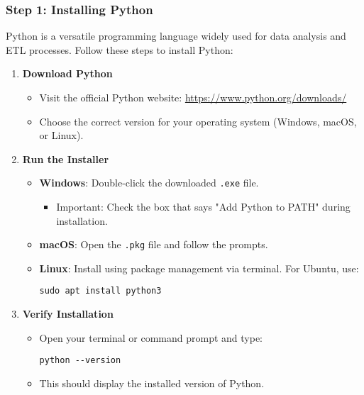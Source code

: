 \documentclass[aspectratio=169]{beamer}
\begin{document}
\begin{frame}[fragile]
    \frametitle{Step 1: Installing Python}
    Python is a versatile programming language widely used for data analysis and ETL processes. Follow these steps to install Python:
    \begin{enumerate}
        \item \textbf{Download Python}
        \begin{itemize}
            \item Visit the official Python website: \url{https://www.python.org/downloads/}
            \item Choose the correct version for your operating system (Windows, macOS, or Linux).
        \end{itemize}
        
        \item \textbf{Run the Installer}
        \begin{itemize}
            \item \textbf{Windows}: Double-click the downloaded \texttt{.exe} file. 
            \begin{itemize}
                \item Important: Check the box that says "Add Python to PATH" during installation.
            \end{itemize}
            \item \textbf{macOS}: Open the \texttt{.pkg} file and follow the prompts.
            \item \textbf{Linux}: Install using package management via terminal. For Ubuntu, use:
            \begin{lstlisting}
sudo apt install python3
            \end{lstlisting}
        \end{itemize}

        \item \textbf{Verify Installation}
        \begin{itemize}
            \item Open your terminal or command prompt and type:
            \begin{lstlisting}
python --version
            \end{lstlisting}
            \item This should display the installed version of Python.
        \end{itemize}
    \end{enumerate}
\end{frame}
\end{document}
